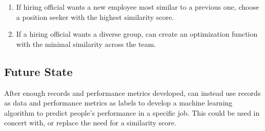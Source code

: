 \documentclass{article}
\begin{document}
\begin{enumerate}
\item If hiring official wants a new employee most similar to a previous one, choose a position seeker with the highest similarity score.
\item If a hiring official wants a diverse group, can create an optimization function with the minimal similarity across the team.
\end{enumerate}


\subsection{Future State}

After enough records and performance metrics developed, can instead use records as data and performance metrics as labels to develop a machine learning algorithm to predict people's performance in a specific job. This could be used in concert with, or replace the need for a similarity score.
\end{document}
